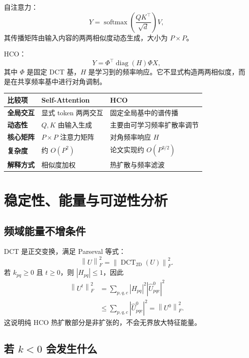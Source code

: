 \documentclass[UTF8,12pt,a4paper,fontset=none]{ctexart}
\numberwithin{equation}{section}
\newcommand{\DCT}{\operatorname{DCT}_{2\mathrm{D}}}
\newcommand{\norm}[1]{\left\lVert #1\right\rVert}
\newcommand{\diag}{\operatorname{diag}}
\begin{document}
自注意力：
\begin{equation}
  Y=\operatorname{softmax}\left(\frac{QK^{\top}}{\sqrt d}\right)V,
\end{equation}
其传播矩阵由输入内容的两两相似度动态生成，大小为 $P\times P$。

HCO：
\begin{equation}
  Y=\Phi^{\top}\diag(H)\Phi X,
\end{equation}
其中 $\Phi$ 是固定 DCT 基，$H$ 是学习到的频率响应。它不显式构造两两相似度，而是在共享频率基中进行对角调制。

\begin{center}
\begin{tabularx}{\textwidth}{>{\bfseries}p{2.5cm}XX}
\toprule
比较项 & Self-Attention & HCO\\
\midrule
全局交互 & 显式 token 两两交互 & 固定全局基中的谱传播\\
动态性 & $Q,K$ 由输入生成 & 主要由可学习频率扩散率调节\\
核心矩阵 & $P\times P$ 注意力矩阵 & 对角频率响应 $H$\\
复杂度 & 约 $O(P^2)$ & 论文实现约 $O(P^{3/2})$\\
解释方式 & 相似度加权 & 热扩散与频率滤波\\
\bottomrule
\end{tabularx}
\end{center}

\section{稳定性、能量与可逆性分析}

\subsection{频域能量不增条件}

DCT 是正交变换，满足 Parseval 等式：
\begin{equation}
  \norm{U}_{F}^{2}
  =\norm{\DCT(U)}_{F}^{2}.
\end{equation}
若 $k_{pq}\ge0$ 且 $t\ge0$，则 $|H_{pq}|\le1$，因此
\begin{align}
  \norm{U^t}_{F}^{2}
  &=\sum_{p,q,c}|H_{pq}|^2
  |\widehat U^0_{pqc}|^2\\
  &\le\sum_{p,q,c}|\widehat U^0_{pqc}|^2
  =\norm{U^0}_{F}^{2}.
\end{align}
这说明纯 HCO 热扩散部分是非扩张的，不会无界放大特征能量。

\subsection{若 \texorpdfstring{$k<0$}{k is negative} 会发生什么}
\end{document}
